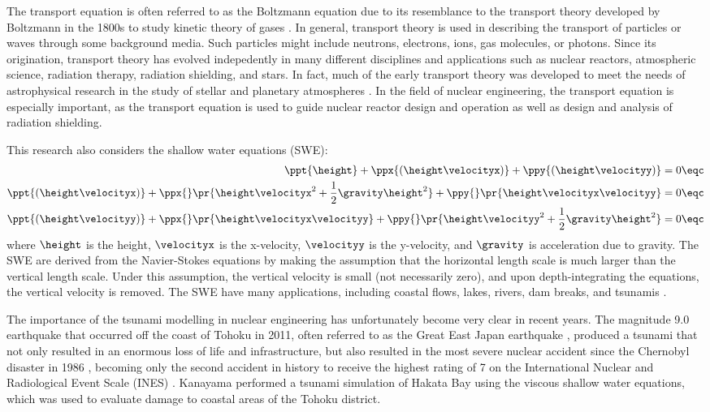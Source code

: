 The transport equation is often referred to as the Boltzmann equation
due to its resemblance to the transport theory developed by Boltzmann
in the 1800s to study kinetic theory of gases \cite{duderstadt}\cite{glasstone}.
In general, transport theory is used in describing the transport of particles
or waves through some background media. Such particles might include neutrons,
electrons, ions, gas molecules, or photons.
Since its origination, transport theory has evolved indepedently in many
different disciplines and applications such as nuclear reactors,
atmospheric science, radiation therapy, radiation shielding, and stars.
In fact, much of the early transport theory was developed to meet the needs
of astrophysical research in the study of stellar and planetary
atmospheres \cite{duderstadt}.
In the field of nuclear engineering, the transport equation is
especially important, as the transport equation is used to guide nuclear
reactor design and operation as well as design and analysis of
radiation shielding.

This research also considers the shallow water equations (SWE):
\begin{subequations}
\begin{align}
  \ppt{\height} + \ppx{(\height\velocityx)} + \ppy{(\height\velocityy)} &= 0
  \eqc\\
  \ppt{(\height\velocityx)}
    + \ppx{}\pr{\height\velocityx^2 + \frac{1}{2}\gravity\height^2}
    + \ppy{}\pr{\height\velocityx\velocityy} &= 0
  \eqc\\
  \ppt{(\height\velocityy)}
    + \ppx{}\pr{\height\velocityx\velocityy}
    + \ppy{}\pr{\height\velocityy^2 + \frac{1}{2}\gravity\height^2} &= 0
  \eqc
\end{align}
\end{subequations}
where $\height$ is the height, $\velocityx$ is the x-velocity,
$\velocityy$ is the y-velocity, and $\gravity$ is acceleration due to
gravity.
The SWE are derived from the Navier-Stokes
equations by making the assumption that the horizontal length
scale is much larger than the vertical length scale. Under this
assumption, the vertical velocity is small (not necessarily zero),
and upon depth-integrating the equations, the vertical velocity
is removed. The SWE have many applications, including coastal
flows, lakes, rivers, dam breaks, and tsunamis \cite{kirby}.

The importance of the tsunami modelling in nuclear engineering has unfortunately
become very clear in recent years.
The magnitude 9.0 earthquake that occurred off the coast of Tohoku in 2011,
often referred to as the Great East Japan earthquake \cite{USGS_tohoku},
produced a tsunami that not only
resulted in an enormous loss of life and infrastructure, but
also resulted in the most severe nuclear accident since the Chernobyl
disaster in 1986 \cite{IAEAfukushima}, becoming only the second
accident in history to receive the highest rating of 7 on the International
Nuclear and Radiological Event Scale (INES) \cite{IAEA_fukushima_scale}.
Kanayama \cite{Kanayama2013} performed a tsunami simulation of
Hakata Bay using the viscous shallow water equations, which was
used to evaluate damage to coastal areas of the Tohoku district.
